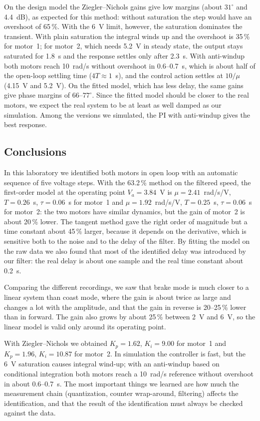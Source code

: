 \documentclass[english]{article}
\begin{document}
\noindent On the design model the Ziegler--Nichols gains give low margins (about $31^\circ$ and 4.4~dB), as expected
for this method: without saturation the step would have an overshoot of 65\,\%. With the 6~V limit, however, the
saturation dominates the transient. With plain saturation the integral winds up and the overshoot is 35\,\% for
motor~1; for motor~2, which needs 5.2~V in steady state, the output stays saturated for 1.8~s and the response settles
only after 2.3~s. With anti-windup both motors reach 10~rad/s without overshoot in 0.6--0.7~s, which is about half of
the open-loop settling time ($4T\approx1$~s), and the control action settles at $10/\mu$ (4.15~V and 5.2~V). On the
fitted model, which has less delay, the same gains give phase margins of $66$--$77^\circ$. Since the fitted model
should be closer to the real motors, we expect the real system to be at least as well damped as our simulation.
Among the versions we simulated, the PI with anti-windup gives the best response.

\subsection{Conclusions}

In this laboratory we identified both motors in open loop with an automatic sequence of five voltage steps. With the
63.2\,\% method on the filtered speed, the first-order model at the operating point $V_a=3.84$~V is
$\mu=2.41$~rad/s/V, $T=0.26$~s, $\tau=0.06$~s for motor~1 and $\mu=1.92$~rad/s/V, $T=0.25$~s, $\tau=0.06$~s for
motor~2: the two motors have similar dynamics, but the gain of motor~2 is about 20\,\% lower. The tangent method gave
the right order of magnitude but a time constant about 45\,\% larger, because it depends on the derivative, which is
sensitive both to the noise and to the delay of the filter. By fitting the model on the raw data we also found that
most of the identified delay was introduced by our filter: the real delay is about one sample and the real time
constant about 0.2~s.

Comparing the different recordings, we saw that brake mode is much closer to a linear system than coast mode, where
the gain is about twice as large and changes a lot with the amplitude, and that the gain in reverse is 20--25\,\%
lower than in forward. The gain also grows by about 25\,\% between 2~V and 6~V, so the linear model is valid only
around its operating point.

With Ziegler--Nichols we obtained $K_p=1.62$, $K_i=9.00$ for motor~1 and $K_p=1.96$, $K_i=10.87$ for motor~2. In
simulation the controller is fast, but the 6~V saturation causes integral wind-up; with an anti-windup based on
conditional integration both motors reach a 10~rad/s reference without overshoot in about 0.6--0.7~s. The most
important things we learned are how much the measurement chain (quantization, counter wrap-around, filtering)
affects the identification, and that the result of the identification must always be checked against the data.
\end{document}
